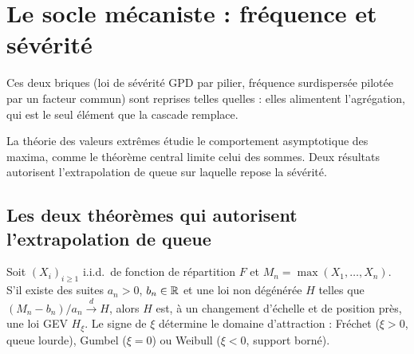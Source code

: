 \chapter{Le socle mécaniste : fréquence et sévérité}
\label{chap:socle}

\noindent Ces deux briques (loi de sévérité GPD par pilier, fréquence surdispersée pilotée par
un facteur commun) sont reprises telles quelles : elles alimentent l'agrégation, qui est le
seul élément que la cascade remplace.


La théorie des valeurs extrêmes étudie le comportement asymptotique des maxima, comme le théorème
central limite celui des sommes. Deux résultats autorisent l'extrapolation de queue sur laquelle
repose la sévérité.

\section{Les deux théorèmes qui autorisent l'extrapolation de queue}

\begin{theorem}\label{soc:th:ftg}
Soit $(X_i)_{i\ge1}$ i.i.d.\ de fonction de répartition $F$ et $M_n=\max(X_1,\dots,X_n)$. S'il existe des suites $a_n>0$, $b_n\in\mathbb{R}$ et une loi non dégénérée $H$ telles que $(M_n-b_n)/a_n \xrightarrow{d} H$, alors $H$ est, à un changement d'échelle et de position près, une loi GEV $H_\xi$. Le signe de $\xi$ détermine le domaine d'attraction : Fréchet ($\xi>0$, queue lourde), Gumbel ($\xi=0$) ou Weibull ($\xi<0$, support borné).
\end{theorem}

